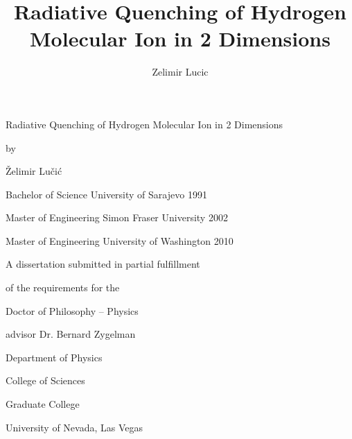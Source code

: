 
\begin{titlepage}
   \begin{center}
       \vspace*{1cm}

Radiative Quenching of Hydrogen Molecular Ion in 2 Dimensions
\title{Radiative Quenching of Hydrogen Molecular Ion  in 2 Dimensions}
\vspace{1.5cm}

by 

Želimir Lučić
\author{Zelimir Lucic}
\vspace{1.5cm}

Bachelor of Science
University of Sarajevo
1991

Master of Engineering
Simon Fraser University
2002

Master of Engineering
University of Washington
2010

\vfill

A dissertation submitted in partial fulfillment

of the requirements for the

Doctor of Philosophy – Physics
\vspace{1cm}

advisor
Dr. Bernard Zygelman

\vspace{1cm}
Department of Physics

College of Sciences

Graduate College

University of Nevada, Las Vegas

\end{center}
\end{titlepage}

